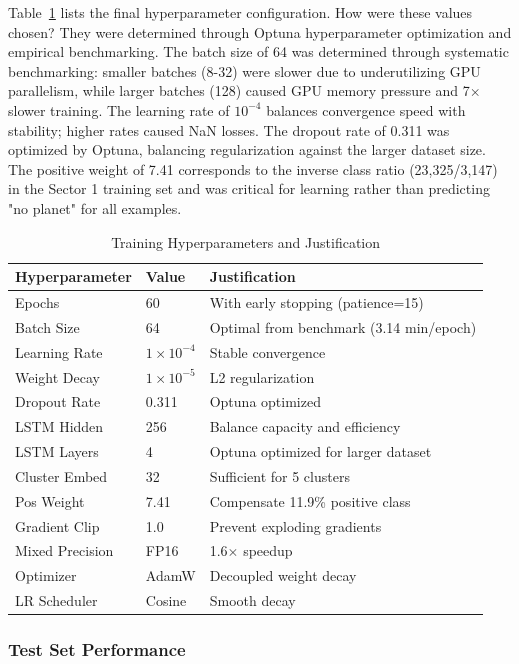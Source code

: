 \documentclass[letterpaper]{article} %
\begin{document}
Table~\ref{tab:bilstm_hyperparams} lists the final hyperparameter configuration. How were these values chosen? They were determined through Optuna hyperparameter optimization and empirical benchmarking. The batch size of 64 was determined through systematic benchmarking: smaller batches (8-32) were slower due to underutilizing GPU parallelism, while larger batches (128) caused GPU memory pressure and 7$\times$ slower training. The learning rate of $10^{-4}$ balances convergence speed with stability; higher rates caused NaN losses. The dropout rate of 0.311 was optimized by Optuna, balancing regularization against the larger dataset size. The positive weight of 7.41 corresponds to the inverse class ratio (23,325/3,147) in the Sector 1 training set and was critical for learning rather than predicting "no planet" for all examples.

\begin{table}[h]
\centering
\caption{Training Hyperparameters and Justification}
\label{tab:bilstm_hyperparams}
\begin{tabular}{@{}llp{3.5cm}@{}}
\toprule
\textbf{Hyperparameter} & \textbf{Value} & \textbf{Justification} \\
\midrule
Epochs & 60 & With early stopping (patience=15) \\
Batch Size & 64 & Optimal from benchmark (3.14 min/epoch) \\
Learning Rate & $1 \times 10^{-4}$ & Stable convergence \\
Weight Decay & $1 \times 10^{-5}$ & L2 regularization \\
Dropout Rate & 0.311 & Optuna optimized \\
LSTM Hidden & 256 & Balance capacity and efficiency \\
LSTM Layers & 4 & Optuna optimized for larger dataset \\
Cluster Embed & 32 & Sufficient for 5 clusters \\
Pos Weight & 7.41 & Compensate 11.9\% positive class \\
Gradient Clip & 1.0 & Prevent exploding gradients \\
Mixed Precision & FP16 & 1.6$\times$ speedup \\
Optimizer & AdamW & Decoupled weight decay \\
LR Scheduler & Cosine & Smooth decay \\
\bottomrule
\end{tabular}
\end{table}

\subsubsection{Test Set Performance}
\end{document}
